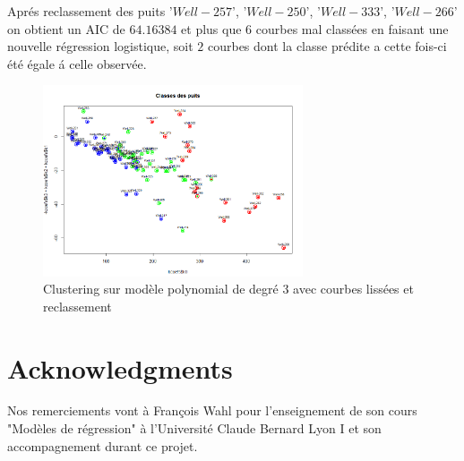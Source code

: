 \documentclass[12pt]{article}
\begin{document}
Apr\'es reclassement des puits  '$Well-257$', '$Well-250$', '$Well-333$', '$Well-266$' on obtient un AIC de $64.16384$ et plus que $6$ courbes mal class\'ees en faisant une nouvelle r\'egression logistique, soit $2$ courbes dont la classe pr\'edite a cette fois-ci \'et\'e \'egale \'a celle observ\'ee.

\begin{figure}[H]
 \centering %
	\includegraphics[width=290px]{cluster_poly_2}
  \caption{\label{fig:reg_exp_clust} Clustering sur mod\`ele polynomial de degr\'e $3$ avec courbes liss\'ees et reclassement}
\end{figure}

\section*{Acknowledgments}
Nos remerciements vont à Fran\c cois Wahl pour l'enseignement de son cours "Mod\`eles de r\'egression" à l'Universit\'e Claude Bernard Lyon I et son accompagnement durant ce projet.


\appendix
\end{document}
